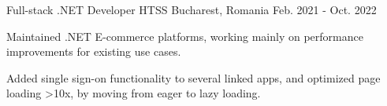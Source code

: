 \begin{cventries}
  \cventry
    {Full-stack .NET Developer} %
    {HTSS} %
    {Bucharest, Romania} %
    {Feb. 2021 - Oct. 2022} %
    {
      \begin{cvitems} %
        \item {Maintained .NET E-commerce platforms, working mainly on performance improvements for existing use cases.}
        \item {Added single sign-on functionality to several linked apps, and optimized page loading >10x, by moving from eager to lazy loading.}
      \end{cvitems}
    }

\end{cventries}
